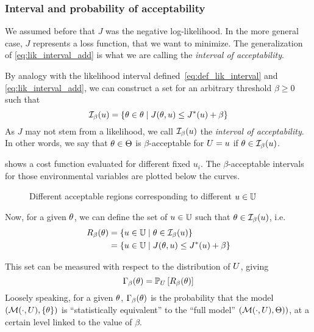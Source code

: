 \documentclass[../../Main_ManuscritThese.tex]{subfiles}
\newcommand\imgpath{/home/victor/acadwriting/Manuscrit/Text/Chapter3/img/}
\begin{document}
  \subsubsection{Interval and probability of acceptability}
     \label{ssec:general_cost_prob}
 We assumed before that $J$ was the negative log-likelihood. In the more general case, $J$ represents a loss function, that we want to minimize. The generalization of \cref{eq:lik_interval_add} is what we are calling the \emph{interval of acceptability}.
  \begin{definition}
  By analogy with the likelihood interval defined~\cref{eq:def_lik_interval} and \cref{eq:lik_interval_add}, we can construct a set for an arbitrary threshold $\beta \geq 0$ such that
  \begin{equation}
    \mathcal{I}_{\beta}(u) = \left\{\theta \in \theta \mid J(\theta,u) \leq J^*(u) + \beta \right\}
  \end{equation}
As $J$ may not stem from a likelihood, we call $\mathcal{I}_{\beta}(u)$ the \emph{interval of acceptability}. In other words, we say that $\theta\in \Theta$ is $\beta$-acceptable for $U=u$ if $\theta \in \mathcal{I}_{\beta}(u)$. 
\end{definition}

 shows a cost function evaluated for different fixed $u_i$. The $\beta$-acceptable intervals for those environmental variables are plotted below the curves.
\begin{figure}[ht]
  \centering
  
  \caption{\label{fig:lik_interval_threshold} Different acceptable regions corresponding to different $u \in \mathbb{U}$}
\end{figure}

  Now, for a given $\theta$, we can define the set of $u\in \mathbb{U}$ such that $\theta \in  \mathcal{I}_{\beta}(u)$, i.e.\
  \begin{align}
    R_{\beta}(\theta) &= \left\{u\in \mathbb{U} \mid \theta \in \mathcal{I}_{\beta}(u) \right\} \\
           &= \left\{u\in \mathbb{U} \mid J(\theta, u)  \leq J^*(u) + \beta \right\}
  \end{align}

  This set can be measured with respect to the distribution of $U$, giving
  \begin{equation}
    \label{eq:def_gamma_additive}
    \Gamma_\beta(\theta) = \mathbb{P}_U\left[R_{\beta}(\theta)\right]
  \end{equation}
  Loosely speaking, for a given $\theta$, $\Gamma_{\beta}(\theta)$ is the probability that the model $(\mathcal{M}(\cdot, U), \{\theta\})$ is ``statistically equivalent'' to the ``full model'' $\left(\mathcal{M}(\cdot, U), \Theta)\right)$, at a certain level linked to the value of $\beta$.
\end{document}
